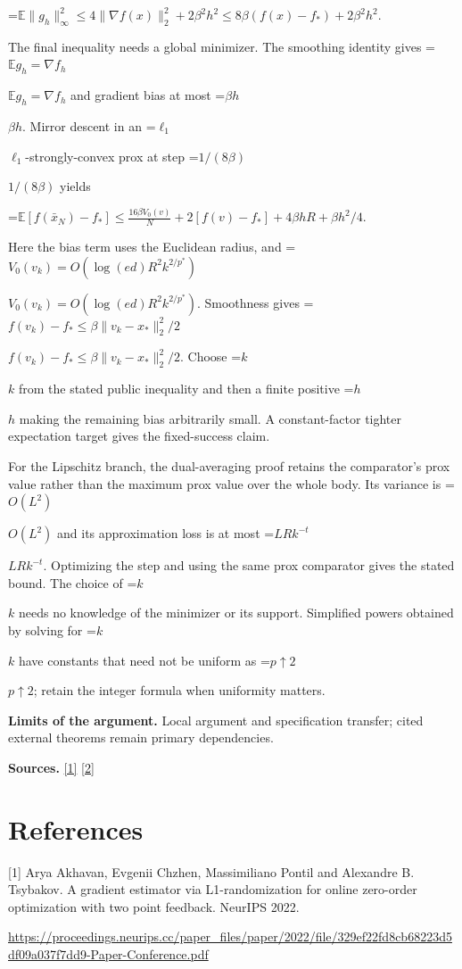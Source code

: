 \documentclass[10pt,a4paper]{article}
\newcommand{\AtlasMath}[1]{\par\begingroup\centering\setbox0=\hbox{$\displaystyle #1$}\ifdim\wd0>1.4\linewidth\typeout{ATLAS WIDE FORMULA: \the\wd0}\fi\ifdim\wd0>\linewidth\resizebox{\linewidth}{!}{\box0}\else\box0\fi\par\endgroup}
\newcommand{\AtlasInlineMath}[1]{\begingroup\setbox0=\hbox{$#1$}\ifdim\wd0>.4\linewidth\endgroup\AtlasMath{#1}\else\endgroup$#1$\fi}
\begin{document}
\AtlasMath{\mathbb E\|g_h\|_\infty^2\le4\|\nabla f(x)\|_2^2+2\beta^2h^2\le8\beta(f(x)-f_*)+2\beta^2h^2.}

The final inequality needs a global minimizer. The smoothing identity gives \AtlasInlineMath{\mathbb E g_h=\nabla f_h} and gradient bias at most \AtlasInlineMath{\beta h}. Mirror descent in an \AtlasInlineMath{\ell_1}-strongly-convex prox at step \AtlasInlineMath{1/(8\beta)} yields

\AtlasMath{\mathbb E[f(\bar x_N)-f_*]\le\frac{16\beta V_0(v)}N+2[f(v)-f_*]+4\beta hR+\beta h^2/4.}

Here the bias term uses the Euclidean radius, and \AtlasInlineMath{V_0(v_k)=O(\log(ed)R^2k^{2/p^*})}. Smoothness gives \AtlasInlineMath{f(v_k)-f_*\le\beta\|v_k-x_*\|_2^2/2}. Choose \AtlasInlineMath{k} from the stated public inequality and then a finite positive \AtlasInlineMath{h} making the remaining bias arbitrarily small. A constant-factor tighter expectation target gives the fixed-success claim.

For the Lipschitz branch, the dual-averaging proof retains the comparator's prox value rather than the maximum prox value over the whole body. Its variance is \AtlasInlineMath{O(L^2)} and its approximation loss is at most \AtlasInlineMath{LRk^{-t}}. Optimizing the step and using the same prox comparator gives the stated bound. The choice of \AtlasInlineMath{k} needs no knowledge of the minimizer or its support. Simplified powers obtained by solving for \AtlasInlineMath{k} have constants that need not be uniform as \AtlasInlineMath{p\uparrow2}; retain the integer formula when uniformity matters.

\textbf{Limits of the argument.} Local argument and specification transfer; cited external theorems remain primary dependencies.

\textbf{Sources.} \href{https://proceedings.neurips.cc/paper_files/paper/2022/file/329ef22fd8cb68223d5df09a037f7dd9-Paper-Conference.pdf}{[1]} \href{https://arxiv.org/html/2610.00345v1}{[2]}

\section{References}
[1] Arya Akhavan, Evgenii Chzhen, Massimiliano Pontil and Alexandre B. Tsybakov. A gradient estimator via L1-randomization for online zero-order optimization with two point feedback. NeurIPS 2022.

\url{https://proceedings.neurips.cc/paper_files/paper/2022/file/329ef22fd8cb68223d5df09a037f7dd9-Paper-Conference.pdf}
\end{document}
